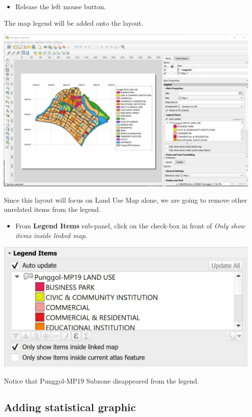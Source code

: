 \documentclass[
  letterpaper,
  DIV=11,
  numbers=noendperiod]{scrreprt}
\providecommand{\tightlist}{%
  \setlength{\itemsep}{0pt}\setlength{\parskip}{0pt}}\usepackage{longtable,booktabs,array}
\begin{document}
\begin{itemize}
\tightlist
\item
  Release the left mouse button.
\end{itemize}

The map legend will be added onto the layout.

\includegraphics{./img04/image64.jpg}

Since this layout will focus on Land Use Map alone, we are going to
remove other unrelated items from the legend.

\begin{itemize}
\tightlist
\item
  From \textbf{Legend Items} sub-panel, click on the check-box in front
  of \emph{Only show items inside linked map}.
\end{itemize}

\includegraphics{./img04/image65.jpg}

Notice that Punggol-MP19 Subzone disappeared from the legend.

\hypertarget{adding-statistical-graphic}{%
\subsection{Adding statistical
graphic}\label{adding-statistical-graphic}}
\end{document}
